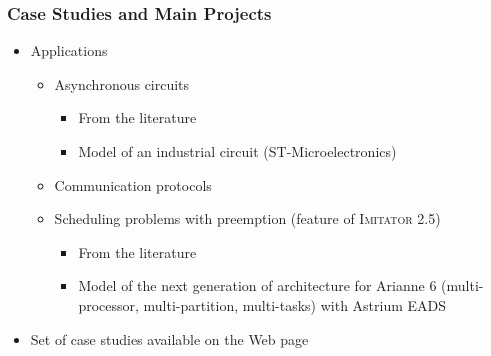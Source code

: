 \documentclass[professionalfont]{beamer}
\newcommand{\couleur}[1]{\textcolor{couleurimportante}{#1}}
\newcommand{\refer}[1]{\textcolor{couleurref}{\cite{#1}}}
\newcommand{\imitator}{\textsc{Imitator}}
\begin{document}
\begin{frame}
\frametitle{Case Studies and Main Projects}

\begin{itemize}
	\item Applications

	\begin{itemize}
		\item Asynchronous circuits
		\begin{itemize}
			\item From the literature
			\item Model of an industrial circuit (ST-Microelectronics)
		\end{itemize}
		
		\smallskip
		
		\item Communication protocols

		\smallskip

		\item Scheduling problems \couleur{with preemption (feature of \imitator{} 2.5)}
		\begin{itemize}
			\item From the literature
			\item Model of the next generation of architecture for Arianne 6 (multi-processor, multi-partition, multi-tasks) with Astrium EADS
		\end{itemize}
	\end{itemize}
	
	\smallskip

	\item Set of case studies available on the Web page

% 
% 
% 		
% 		


\end{itemize}

\end{frame}



\end{document}
